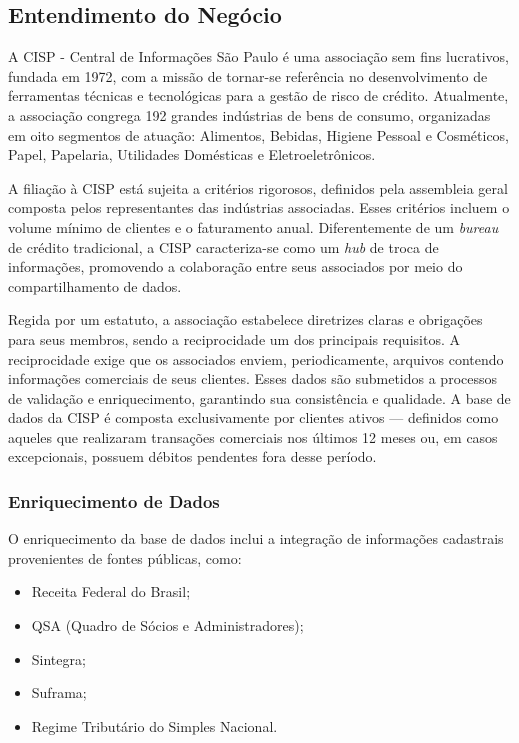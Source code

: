 \documentclass[12pt,a4paper]{article}
\begin{document}
\subsection{Entendimento do Negócio}

A CISP - Central de Informações São Paulo é uma associação sem fins lucrativos, fundada em 1972, com a missão de tornar-se referência no desenvolvimento de ferramentas técnicas e tecnológicas para a gestão de risco de crédito. Atualmente, a associação congrega 192 grandes indústrias de bens de consumo, organizadas em oito segmentos de atuação: Alimentos, Bebidas, Higiene Pessoal e Cosméticos, Papel, Papelaria, Utilidades Domésticas e Eletroeletrônicos.

A filiação à CISP está sujeita a critérios rigorosos, definidos pela assembleia geral composta pelos representantes das indústrias associadas. Esses critérios incluem o volume mínimo de clientes e o faturamento anual. Diferentemente de um \textit{bureau} de crédito tradicional, a CISP caracteriza-se como um \textit{hub} de troca de informações, promovendo a colaboração entre seus associados por meio do compartilhamento de dados.

Regida por um estatuto, a associação estabelece diretrizes claras e obrigações para seus membros, sendo a reciprocidade um dos principais requisitos. A reciprocidade exige que os associados enviem, periodicamente, arquivos contendo informações comerciais de seus clientes. Esses dados são submetidos a processos de validação e enriquecimento, garantindo sua consistência e qualidade. A base de dados da CISP é composta exclusivamente por clientes ativos — definidos como aqueles que realizaram transações comerciais nos últimos 12 meses ou, em casos excepcionais, possuem débitos pendentes fora desse período.

\subsubsection{Enriquecimento de Dados}

O enriquecimento da base de dados inclui a integração de informações cadastrais provenientes de fontes públicas, como:
\begin{itemize}
    \item Receita Federal do Brasil;
    \item QSA (Quadro de Sócios e Administradores);
    \item Sintegra;
    \item Suframa;
    \item Regime Tributário do Simples Nacional.
\end{itemize}
\end{document}
